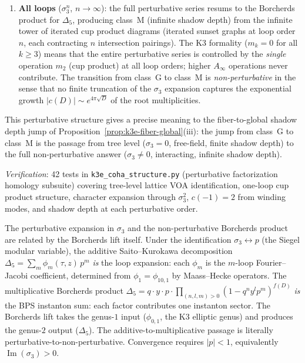 \begin{enumerate}[label=(\roman*)]
\item \textbf{All loops} ($\sigma_3^n$, $n \to \infty$): the
 full perturbative series resums to the Borcherds product
 for $\Delta_5$, producing class~M (infinite shadow depth)
 from the infinite tower of iterated cup product diagrams
 (iterated sunset graphs at loop order $n$, each contracting
 $n$ intersection pairings). The K3 formality ($m_k = 0$
 for all $k \geq 3$) means that the entire perturbative
 series is controlled by the \emph{single} operation $m_2$
 (cup product) at all loop orders; higher $A_\infty$
 operations never contribute. The
 transition from class~G to class~M is \emph{non-perturbative}
 in the sense that no finite truncation of the $\sigma_3$
 expansion captures the exponential growth
 $|c(D)| \sim e^{4\pi\sqrt{D}}$ of the root multiplicities.
\end{enumerate}

This perturbative structure gives a precise meaning to the
fiber-to-global shadow depth jump of
Proposition~\ref{prop:k3e-fiber-global}(iii): the jump from class~G
to class~M is the passage from tree level ($\sigma_3 = 0$,
free-field, finite shadow depth) to the full non-perturbative
answer ($\sigma_3 \neq 0$, interacting, infinite shadow depth).

\noindent\textit{Verification}: 42 tests in \texttt{k3e\_coha\_structure.py}
(perturbative factorization homology subsuite) covering tree-level
lattice VOA identification, one-loop cup product structure,
character expansion through $\sigma_3^2$, $c(-1) = 2$ from
winding modes, and shadow depth at each perturbative order.

\begin{remark}
\label{rem:borcherds-resummation}
The perturbative expansion in $\sigma_3$ and the non-perturbative Borcherds product are related by the Borcherds lift itself. Under the identification $\sigma_3 \leftrightarrow p$ (the Siegel modular variable), the additive Saito--Kurokawa decomposition $\Delta_5 = \sum_m \phi_m(\tau, z) \, p^m$ \emph{is} the loop expansion: each $\phi_m$ is the $m$-loop Fourier--Jacobi coefficient, determined from $\phi_1 = \phi_{10,1}$ by Maass--Hecke operators. The multiplicative Borcherds product $\Delta_5 = q \cdot y \cdot p \cdot \prod_{(n,l,m) > 0}(1 - q^n y^l p^m)^{f(D)}$ \emph{is} the BPS instanton sum: each factor contributes one instanton sector. The Borcherds lift takes the genus-$1$ input ($\phi_{0,1}$, the K3 elliptic genus) and produces the genus-$2$ output ($\Delta_5$). The additive-to-multiplicative passage is literally perturbative-to-non-perturbative. Convergence requires $|p| < 1$, equivalently $\operatorname{Im}(\sigma_3) > 0$.
\end{remark}

